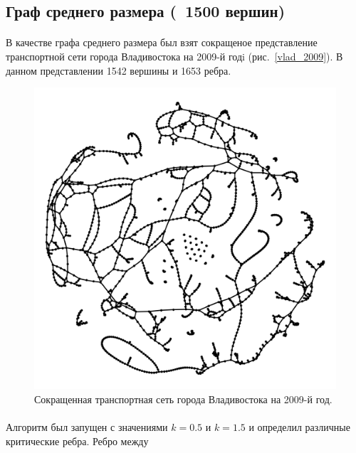 \documentclass[12pt]{article}
\begin{document}
\subsection{Граф среднего размера (~1500 вершин)}

\paragraph{}
В качестве графа среднего размера был взят сокращеное представление 
транспортной сети города Владивостока на 2009-й годi (рис.~\ref{vlad_2009}). 
В данном представлении 1542 вершины и 1653 ребра.

\begin{figure}[h]
    \centering
    \includegraphics[scale=0.3]{vlad_2009.png}
    \caption{Сокращенная транспортная сеть города Владивостока на 2009-й год.}
    \label{fig:vlad_2009}
\end{figure}

\paragraph{}
Алгоритм был запущен с значениями $k = 0.5$ и $k = 1.5$ и определил различные
критические ребра. Ребро между

\end{document}
